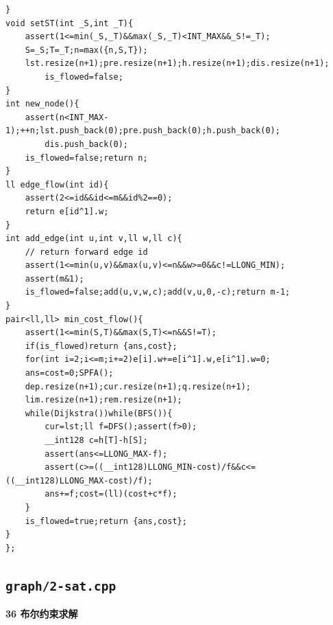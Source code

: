 \documentclass[UTF8,a4paper,10pt]{ctexart}
\begin{document}
\begin{lstlisting}[firstnumber=1]
}
void setST(int _S,int _T){
	assert(1<=min(_S,_T)&&max(_S,_T)<INT_MAX&&_S!=_T);
	S=_S;T=_T;n=max({n,S,T});
	lst.resize(n+1);pre.resize(n+1);h.resize(n+1);dis.resize(n+1);
		is_flowed=false;
}
int new_node(){
	assert(n<INT_MAX-1);++n;lst.push_back(0);pre.push_back(0);h.push_back(0);
		dis.push_back(0);
	is_flowed=false;return n;
}
ll edge_flow(int id){
	assert(2<=id&&id<=m&&id%2==0);
	return e[id^1].w;
}
int add_edge(int u,int v,ll w,ll c){
	// return forward edge id
	assert(1<=min(u,v)&&max(u,v)<=n&&w>=0&&c!=LLONG_MIN);
	assert(m&1);
	is_flowed=false;add(u,v,w,c);add(v,u,0,-c);return m-1;
}
pair<ll,ll> min_cost_flow(){
	assert(1<=min(S,T)&&max(S,T)<=n&&S!=T);
	if(is_flowed)return {ans,cost};
	for(int i=2;i<=m;i+=2)e[i].w+=e[i^1].w,e[i^1].w=0;
	ans=cost=0;SPFA();
	dep.resize(n+1);cur.resize(n+1);q.resize(n+1);
	lim.resize(n+1);rem.resize(n+1);
	while(Dijkstra())while(BFS()){
		cur=lst;ll f=DFS();assert(f>0);
		__int128 c=h[T]-h[S];
		assert(ans<=LLONG_MAX-f);
		assert(c>=((__int128)LLONG_MIN-cost)/f&&c<=((__int128)LLONG_MAX-cost)/f);
		ans+=f;cost=(ll)(cost+c*f);
	}
	is_flowed=true;return {ans,cost};
}
};
\end{lstlisting}
\par\vspace{1em}
\subsection{\texttt{graph/2-sat.cpp}}
\textbf{36 布尔约束求解}
\end{document}
